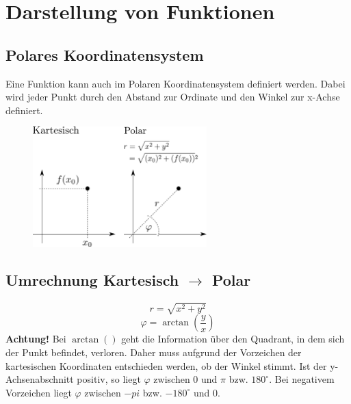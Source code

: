 



\section{Darstellung von Funktionen}
\subsection{Polares Koordinatensystem}
Eine Funktion kann auch im Polaren Koordinatensystem definiert werden. 
Dabei wird jeder Punkt durch den Abstand zur Ordinate und den Winkel zur 
x-Achse definiert. 

\begin{figure}[h!]
\centering
\includegraphics[width=0.6\textwidth]{../fig/polar.pdf}
\end{figure}


\subsection{Umrechnung Kartesisch $\rightarrow$ Polar}
\[ \boxed{r = \sqrt{x^2 + y^2}} \]
\[ \boxed{\varphi = \arctan\left(\frac{y}{x}\right)} \]
\textbf{Achtung!} Bei $\arctan()$ geht die Information über den Quadrant, in 
dem sich der Punkt befindet, verloren. Daher muss aufgrund der Vorzeichen der 
kartesischen Koordinaten entschieden werden, ob der Winkel stimmt. Ist der 
y-Achsenabschnitt positiv, so liegt $\varphi$ zwischen $0$ und $\pi$ bzw. 
$180^\circ$. Bei negativem Vorzeichen liegt $\varphi$ zwischen $-pi$ bzw. 
$-180^\circ$ und 0. 

